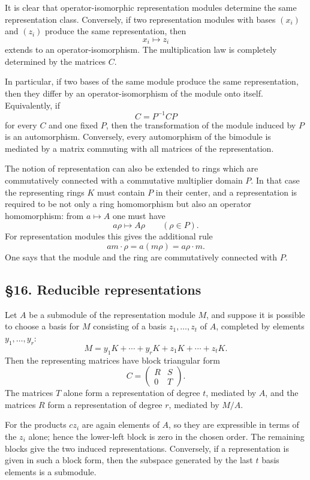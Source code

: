 \documentclass[
  11pt,
]{article}
\begin{document}
It is clear that operator-isomorphic representation modules determine
the same representation class. Conversely, if two representation modules
with bases \((x_i)\) and \((z_i)\) produce the same representation, then
\[
  x_i\mapsto z_i
\] extends to an operator-isomorphism. The multiplication law is
completely determined by the matrices \(C\).

In particular, if two bases of the same module produce the same
representation, then they differ by an operator-isomorphism of the
module onto itself. Equivalently, if \[
  C=P^{-1}CP
\] for every \(C\) and one fixed \(P\), then the transformation of the
module induced by \(P\) is an automorphism. Conversely, every
automorphism of the bimodule is mediated by a matrix commuting with all
matrices of the representation.

The notion of representation can also be extended to rings which are
commutatively connected with a commutative multiplier domain \(P\). In
that case the representing rings \(K\) must contain \(P\) in their
center, and a representation is required to be not only a ring
homomorphism but also an operator homomorphism: from \(a\mapsto A\) one
must have \[
  a\rho\mapsto A\rho\qquad(\rho\in P).
\] For representation modules this gives the additional rule \[
  am\cdot\rho=a(m\rho)=a\rho\cdot m.
\] One says that the module and the ring are commutatively connected
with \(P\).

\subsection{§16. Reducible
representations}\label{reducible-representations}

Let \(A\) be a submodule of the representation module \(M\), and suppose
it is possible to choose a basis for \(M\) consisting of a basis
\(z_1,\ldots,z_t\) of \(A\), completed by elements \(y_1,\ldots,y_r\):
\[
  M=y_1K+\cdots+y_rK+z_1K+\cdots+z_tK.
\] Then the representing matrices have block triangular form \[
  C=\begin{pmatrix} R&S\\0&T\end{pmatrix}.
\] The matrices \(T\) alone form a representation of degree \(t\),
mediated by \(A\), and the matrices \(R\) form a representation of
degree \(r\), mediated by \(M/A\).

For the products \(cz_i\) are again elements of \(A\), so they are
expressible in terms of the \(z_i\) alone; hence the lower-left block is
zero in the chosen order. The remaining blocks give the two induced
representations. Conversely, if a representation is given in such a
block form, then the subspace generated by the last \(t\) basis elements
is a submodule.
\end{document}

